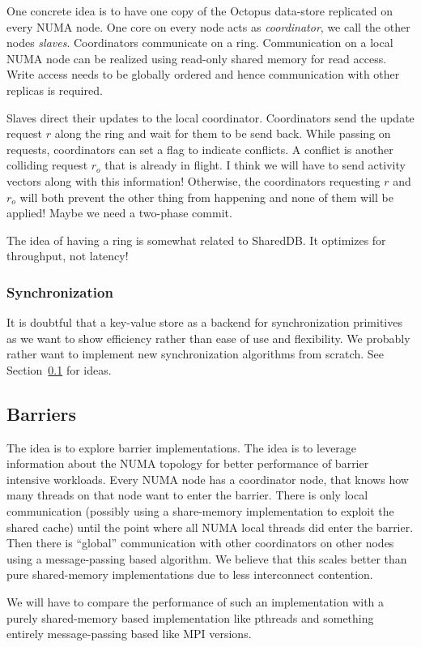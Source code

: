 \documentclass{article}
\begin{document}
One concrete idea is to have one copy of the Octopus data-store
replicated on every NUMA node. One core on every node acts as
\emph{coordinator}, we call the other nodes \emph{slaves}.
Coordinators communicate on a ring. Communication on a local NUMA node
can be realized using read-only shared memory for read access. Write
access needs to be globally ordered and hence communication with other
replicas is required. 

Slaves direct their updates to the local coordinator. Coordinators
send the update request $r$ along the ring and wait for them to be
send back. While passing on requests, coordinators can set a flag to
indicate conflicts. A conflict is another colliding request $r_o$ that
is already in flight. I think we will have to send activity vectors
along with this information! Otherwise, the coordinators requesting
$r$ and $r_o$ will both prevent the other thing from happening and
none of them will be applied! Maybe we need a two-phase commit.

The idea of having a ring is somewhat related to SharedDB. It
optimizes for throughput, not latency!

\subsubsection{Synchronization}

It is doubtful that a key-value store as a backend for synchronization
primitives as we want to show efficiency rather than ease of use and
flexibility. We probably rather want to implement new synchronization
algorithms from scratch. See Section~\ref{barriers} for ideas.

\subsection{Barriers}
\label{barriers}

The idea is to explore barrier implementations. The idea is to
leverage information about the NUMA topology for better performance of
barrier intensive workloads. Every NUMA node has a coordinator node,
that knows how many threads on that node want to enter the
barrier. There is only local communication (possibly using a
share-memory implementation to exploit the shared cache) until the
point where all NUMA local threads did enter the barrier.  Then there
is ``global'' communication with other coordinators on other nodes
using a message-passing based algorithm. We believe that this scales
better than pure shared-memory implementations due to less
interconnect contention.

We will have to compare the performance of such an implementation with
a purely shared-memory based implementation like pthreads and
something entirely message-passing based like MPI versions.

\newpage



\label{LastPage}

\newpage



\end{document}
